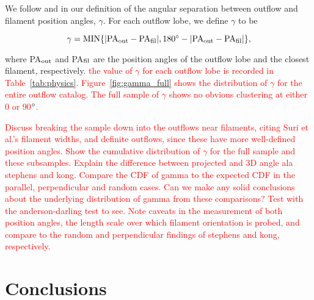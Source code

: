 \documentclass[twocolumn]{aastex62}
\begin{document}
We follow \citet{Stephens17} and \citet{Kong19} in our definition of the angular separation between outflow and filament position angles, $\gamma$. For each outflow lobe, we define $\gamma$ to be 

\begin{equation}
    \gamma = \rm{MIN}\{|\rm{PA}_{\rm out} - \rm{PA}_{\rm fil}|, 180\degr - |\rm{PA}_{\rm out} - \rm{PA}_{\rm fil}|\},
\end{equation}

where PA$_{\rm out}$ and PA$_{\rm fil}$ are the position angles of the outflow lobe and the closest filament, respectively. \textcolor{red}{the value of $\gamma$ for each outflow lobe is recorded in Table~\ref{tab:physics}. Figure~\ref{fig:gamma_full} shows the distribution of $\gamma$ for the entire outflow catalog. The full sample of $\gamma$ shows no obvious clustering at either 0 or 90$\mbox{$^\circ$}$.}

\textcolor{red}{Discuss breaking the sample down into the outflows near filaments, citing Suri et al.'s filament widths, and definite outflows, since these have more well-defined position angles. Show the cumulative distribution of $\gamma$ for the full sample and these subsamples. Explain the difference between projected and 3D angle ala stephens and kong. Compare the CDF of gamma to the expected CDF in the parallel, perpendicular and random cases. Can we make any solid conclusions about the underlying distribution of gamma from these comparisons? Test with the anderson-darling test to see. Note caveats in the measurement of both position angles, the length scale over which filament orientation is probed, and compare to the random and perpendicular findings of stephens and kong, respectively.}

\section{Conclusions}











\end{document}
